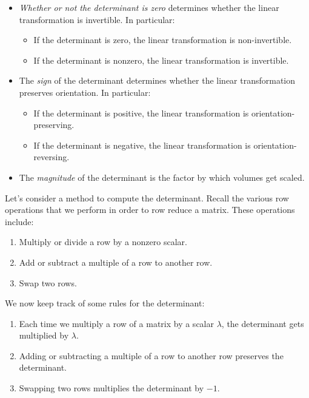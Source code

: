 \documentclass[10pt]{amsart}
\begin{document}
\begin{itemize}
\item {\em Whether or not the determinant is zero} determines whether
  the linear transformation is invertible. In particular:

  \begin{itemize}
  \item If the determinant is zero, the linear transformation is
    non-invertible.
  \item If the determinant is nonzero, the linear transformation is
    invertible.
  \end{itemize}
\item The {\em sign} of the determinant determines whether the linear
  transformation preserves orientation. In particular:

  \begin{itemize}
  \item If the determinant is positive, the linear transformation is
    orientation-preserving.
  \item If the determinant is negative, the linear transformation is
    orientation-reversing.
  \end{itemize}
\item The {\em magnitude} of the determinant is the factor by which
  volumes get scaled.
\end{itemize}

Let's consider a method to compute the determinant. Recall the various
row operations that we perform in order to row reduce a matrix. These
operations include:

\begin{enumerate}
\item Multiply or divide a row by a nonzero scalar.
\item Add or subtract a multiple of a row to another row.
\item Swap two rows.
\end{enumerate}

We now keep track of some rules for the determinant:

\begin{enumerate}
\item Each time we multiply a row of a matrix by a scalar $\lambda$,
  the determinant gets multiplied by $\lambda$.
\item Adding or subtracting a multiple of a row to another row
  preserves the determinant.
\item Swapping two rows multiplies the determinant by $-1$.
\end{enumerate}
\end{document}
